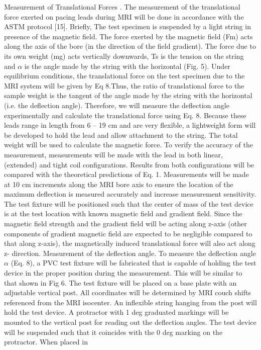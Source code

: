 Measurement of Translational Forces . The measurement of the translational force
exerted on pacing leads during MRI will be done in accordance with the ASTM protocol
[15]. Briefly, The test specimen is suspended by a light string in presence of the magnetic
field. The force exerted by the magnetic field (Fm) acts along the axis of the bore (in the
direction of the field gradient). The force due to its own weight (mg) acts vertically
downwards, Ts is the tension on the string and $\alpha$ is the angle made by the string with the
horizontal (Fig. 5). Under equilibrium conditions, the translational force on the test
specimen due to the MRI system will be given by Eq 8.Thus, the ratio of translational
force to the sample weight is the tangent of the angle made by the string with the horizontal (i.e. the deflection angle).
Therefore, we will measure the deflection angle experimentally and calculate the translational force using Eq. 8. Because
these leads range in length from 6 – 19 cm and are very flexible, a lightweight form will be developed to hold the lead and
allow attachment to the string. The total weight will be used to calculate the magnetic force. To verify the accuracy of the measurement, measurements will be made with the lead in both linear, (extended) and tight coil configurations. Results
from both configurations will be compared with the theoretical predictions of Eq. 1. Measurements will be made at 10
cm increments along the MRI bore axis to ensure the location of the maximum deflection is measured accurately
and increase measurement sensitivity. The test fixture will be positioned such that the center of mass of the test
device is at the test location with known magnetic field and gradient field. Since the magnetic field strength and
the gradient field will be acting along z-axis (other components of gradient magnetic field are expected to be
negligible compared to that along z-axis), the magnetically induced translational force will also act along z-
direction.
Measurement of the deflection angle. To measure the
deflection angle $\alpha$ (Eq. 8), a PVC test fixture will be
fabricated that is capable of holding the test device in
the proper position during the measurement. This will
be similar to that shown in Fig 6. The test fixture will be
placed on a base plate with an adjustable vertical post.
All coordinates will be determined by MRI couch shifts
referenced from the MRI isocenter. An inflexible string
hanging from the post will hold the test device. A
protractor with 1 deg graduated markings will be mounted
to the vertical post for reading out the deflection angles.
The test device will be suspended such that it coincides
with the 0 deg marking on the protractor. When placed in

